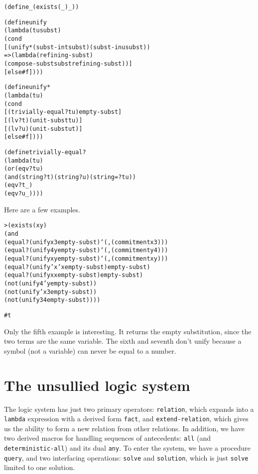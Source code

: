 \begin{alltt}
(define _ (exists (_) _))

(define unify
  (lambda (t u subst)
    (cond
      [(unify* (subst-in t subst) (subst-in u subst))
       => (lambda (refining-subst)
            (compose-subst subst refining-subst))]
      [else #f])))
\end{alltt}
\newpage
\begin{alltt}
(define unify*
  (lambda (t u)
    (cond
      [(trivially-equal? t u) empty-subst]
      [(lv? t) (unit-subst t u)]
      [(lv? u) (unit-subst u t)]
      [else #f])))
\end{alltt}

\begin{alltt}
(define trivially-equal?
  (lambda (t u)
    (or (eqv? t u)
        (and (string? t) (string? u) (string=? t u))
        (eqv? t _)
        (eqv? u _))))
\end{alltt}

Here are a few examples.

\begin{alltt}
> (exists (x y)
    (and
      (equal? (unify x 3 empty-subst) `(,(commitment x 3)))
      (equal? (unify 4 y empty-subst) `(,(commitment y 4)))
      (equal? (unify x y empty-subst) `(,(commitment x y)))
      (equal? (unify 'x 'x empty-subst) empty-subst)
      (equal? (unify x x empty-subst) empty-subst)
      (not (unify 4 'y empty-subst))
      (not (unify 'x 3 empty-subst))
      (not (unify 3 4 empty-subst))))

#t
\end{alltt}

Only the fifth example is interesting.  It returns the empty
substitution, since the two terms are the same variable.  The sixth
and seventh don't unify because a symbol (not a variable) can never be
equal to a number.
\newpage

\section{The unsullied logic system}

The logic system has just two primary operators: \texttt{relation},
which expands into a \texttt{lambda} expression with a derived form
\texttt{fact}, and \texttt{extend-relation}, which gives us the
ability to form a new relation from other relations.  In addition, we
have two derived macros for handling sequences of antecedents:
\texttt{all} (and \texttt{deterministic-all}) and its dual
\texttt{any}.  To enter the system, we have a procedure
\texttt{query}, and two interfacing operations: \texttt{solve} and
\texttt{solution}, which is just \texttt{solve} limited to one
solution.

